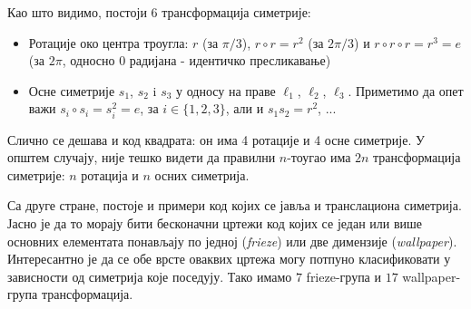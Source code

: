 \documentclass{report}
\theoremstyle{plain}
\theoremstyle{definition}
\begin{document}
Као што видимо, постоји 6 трансформација симетрије: \begin{itemize}
                                                         \item Ротације око центра троугла: $r$ (за $\pi/3$), $r\circ r = r^2$ (за $2\pi/3$) и $r\circ r \circ r = r^3 = e$ (за $2\pi$, односно $0$ радијана - идентичко пресликавање)
                                                         \item Осне симетрије $s_1$, $s_2$ i $s_3$ у односу на праве $\ell_1$, $\ell_2$, $\ell_3$. Приметимо да опет важи $s_i \circ s_i = s_i^2 = e$, за $i\in \lbrace 1, 2, 3 \rbrace$, али и $s_1 s_2 = r^2$, ...
                                                       \end{itemize}
Слично се дешава и код квадрата: он има 4 ротације и 4 осне симетрије. У општем случају, није тешко видети да правилни $n$-тоугао има $2n$ трансформација симетрије: $n$ ротација и $n$ осних симетрија.

Са друге стране, постоје и примери код којих се јавља и транслациона симетрија. Јасно је да то морају бити бесконачни цртежи код којих се један или више основних елементата понављају по једној (\emph{frieze}) или две димензије (\emph{wallpaper}). Интересантно је да се обе врсте оваквих цртежа могу потпуно класификовати у зависности од симетрија које поседују. Тако имамо $7$ frieze-група и $17$ wallpaper-група трансформација.
\end{document}
